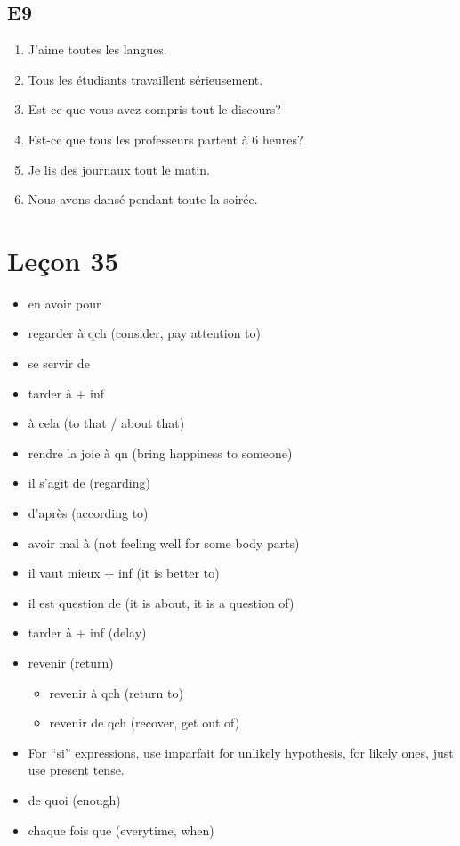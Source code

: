 \documentclass{book}
\begin{document}
    \section{E9}
        \begin{enumerate}
            \item J'aime toutes les langues.
            \item Tous les étudiants travaillent sérieusement.
            \item Est-ce que vous avez compris tout le discours?
            \item Est-ce que tous les professeurs partent à 6 heures?
            \item Je lis des journaux tout le matin.
            \item Nous avons dansé pendant toute la soirée.
        \end{enumerate}

\chapter{Leçon 35}
    \begin{itemize}
        \item en avoir pour %
        \item regarder à qch (consider, pay attention to)
        \item se servir de %
        \item tarder à + inf %
        \item à cela (to that / about that)
        \item rendre la joie à qn (bring happiness to someone)
        \item il s'agit de (regarding)
        \item d'après (according to)
        \item avoir mal à (not feeling well for some body parts)
        \item il vaut mieux + inf (it is better to)
        \item il est question de (it is about, it is a question of)
        \item tarder à + inf (delay)
        \item revenir (return)
        \begin{itemize}
            \item revenir à qch (return to)
            \item revenir de qch (recover, get out of)
        \end{itemize}
        \item For ``si'' expressions, use imparfait for unlikely hypothesis, for likely ones, just use present tense.
        \item de quoi (enough)
        \item chaque fois que (everytime, when)
    \end{itemize}
\end{document}
